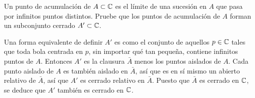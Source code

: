 \begin{exercise}
Un punto de acumulación de $A \subset \mathbb C$ es el límite de una sucesión en $A$ que pasa por infinitos puntos distintos. Pruebe que los puntos de acumulación de $A$ forman un subconjunto cerrado $A' \subset \mathbb C$.
\end{exercise}

\begin{solution}
Una forma equivalente de definir $A'$ es como el conjunto de aquellos $p \in \mathbb C$ tales que toda bola centrada en $p$, sin importar qué tan pequeña, contiene infinitos puntos de $A$. Entonces $A'$ es la clausura $\bar A$ menos los puntos aislados de $A$. Cada punto aislado de $A$ es también aislado en $\bar A$, así que es en sí mismo un abierto relativo de $\bar A$, así que $A'$ es cerrado relativo en $\bar A$. Puesto que $\bar A$ es cerrado en $\mathbb C$, se deduce que $A'$ también es cerrado en $\mathbb C$.
\end{solution}
